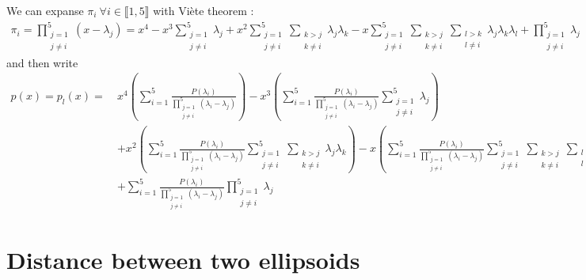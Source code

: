 \documentclass[class=report, float=false, crop=false]{standalone}
\begin{document}
We can expanse $\pi_i~\forall i \in \llbracket1,5\rrbracket$ with Viète theorem \cite{viete}:
\begin{align*}
\pi_i = \prod_{\substack{j=1\\j\neq i}}^5 (x - \lambda_j) = x^4 - x^3 \sum_{\substack{j=1\\j\neq i}}^5 \lambda_j + x^2 \sum_{\substack{j=1\\j\neq i}}^5 \sum_{\substack{k>j\\k\neq i}} \lambda_j\lambda_k - x \sum_{\substack{j=1\\j\neq i}}^5 \sum_{\substack{k>j\\k\neq i}} \sum_{\substack{l>k\\l\neq i}} \lambda_j\lambda_k\lambda_l + \prod_{\substack{j=1\\j\neq i}}^5 \lambda_j
\end{align*}
and then write
\begin{equation}
\begin{aligned}
p(x) = p_l(x) =~ &x^4\left(\sum_{i=1}^5 \frac{P(\lambda_i)}{\prod_{\substack{j=1\\j\neq i}}^5 (\lambda_i - \lambda_j)}\right) - x^3\left(\sum_{i=1}^5 \frac{P(\lambda_i)}{\prod_{\substack{j=1\\j\neq i}}^5 (\lambda_i - \lambda_j)}\sum_{\substack{j=1\\j\neq i}}^5 \lambda_j\right)\\
&+ x^2 \left(\sum_{i=1}^5 \frac{P(\lambda_i)}{\prod_{\substack{j=1\\j\neq i}}^5 (\lambda_i - \lambda_j)}\sum_{\substack{j=1\\j\neq i}}^5 \sum_{\substack{k>j\\k\neq i}} \lambda_j\lambda_k\right) - x\left(\sum_{i=1}^5 \frac{P(\lambda_i)}{\prod_{\substack{j=1\\j\neq i}}^5 (\lambda_i - \lambda_j)}\sum_{\substack{j=1\\j\neq i}}^5 \sum_{\substack{k>j\\k\neq i}} \sum_{\substack{l>k\\l\neq i}} \lambda_j\lambda_k\lambda_l\right)\\
&+ \sum_{i=1}^5 \frac{P(\lambda_i)}{\prod_{\substack{j=1\\j\neq i}}^5 (\lambda_i - \lambda_j)}\prod_{\substack{j=1\\j\neq i}}^5 \lambda_j
\end{aligned}
\end{equation}

\section{Distance between two ellipsoids}
\label{distance}
\end{document}
